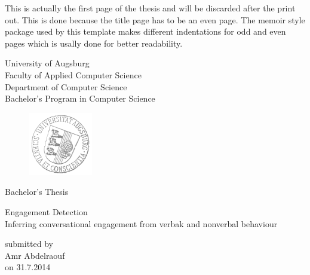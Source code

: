 \documentclass[12pt, a4paper, fleqn]{memoir}%
\begin{document}
\frontmatter

\pagestyle{empty}
This is actually the first page of the thesis and will be discarded after the print out. This is done because 
the title page has to be an even page. The memoir style package used by this template makes different indentations 
for odd and even pages which is usally done for better readability.  
\clearpage

\pagestyle{empty}
\rmfamily
\noindent
\begin{center}
University of Augsburg\\
Faculty of Applied Computer Science\\
Department of Computer Science\\
Bachelor's Program in Computer Science\\
\end{center}
\begin{figure}[h]
\centering
\includegraphics[width=0.25\textwidth]{logo.png}
\end{figure}
\vfill\vfill
\begin{center}
\Large
Bachelor's Thesis\\
\end{center}
\vspace{2.0em}
\begin{center}
\Large
\LARGE Engagement Detection\\ \vspace{10pt} 
\Large Inferring conversational engagement from verbak and nonverbal behaviour
\end{center}
\vspace{2.0em}
\begin{center}
    \normalsize
    submitted by\\
    \large
    Amr Abdelraouf\\
    \normalsize
    on 31.7.2014
\end{center}
\end{document}
